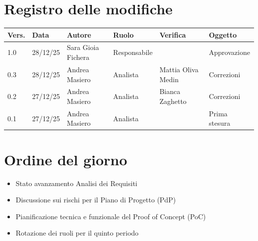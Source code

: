 \documentclass[a4paper,12pt]{article}
\begin{document}


\newpage
\section*{Registro delle modifiche}
\begin{tabularx}{\textwidth}{|l|l|l|l|X|X|}
\hline
\textbf{Vers.} & \textbf{Data} & \textbf{Autore} & \textbf{Ruolo} & \textbf{Verifica} & \textbf{Oggetto} \\
\hline
1.0 & 28/12/25 & Sara Gioia Fichera & Responsabile &  & Approvazione \\
\hline
0.3 & 28/12/25 & Andrea Masiero & Analista & Mattia Oliva Medin & Correzioni \\
\hline
0.2 & 27/12/25 & Andrea Masiero & Analista & Bianca Zaghetto & Correzioni \\
\hline
0.1 & 27/12/25 & Andrea Masiero & Analista & & Prima stesura \\
\hline
\end{tabularx}

\newpage
\tableofcontents

\newpage
\markright{}

\newpage
\section{Ordine del giorno}
\begin{itemize}
    \item Stato avanzamento Analisi dei Requisiti
    \item Discussione sui rischi per il Piano di Progetto (PdP)
    \item Pianificazione tecnica e funzionale del Proof of Concept (PoC)
    \item Rotazione dei ruoli per il quinto periodo
\end{itemize}

\newpage
\end{document}
